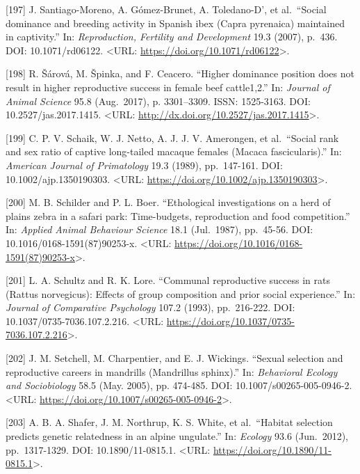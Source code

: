 \documentclass[
]{article}
\begin{document}
{[}197{]} J. Santiago-Moreno, A. Gómez-Brunet, A. Toledano-D'\iaz, et
al.~``Social dominance and breeding activity in Spanish ibex (Capra
pyrenaica) maintained in captivity.'' In: \emph{Reproduction, Fertility
and Development} 19.3 (2007), p.~436. DOI: 10.1071/rd06122.
\textless URL: \url{https://doi.org/10.1071/rd06122}\textgreater.

{[}198{]} R. Šárová, M. Špinka, and F. Ceacero. ``Higher dominance
position does not result in higher reproductive success in female beef
cattle1,2.'' In: \emph{Journal of Animal Science} 95.8 (Aug.~2017), p.
3301--3309. ISSN: 1525-3163. DOI: 10.2527/jas.2017.1415. \textless URL:
\url{http://dx.doi.org/10.2527/jas.2017.1415}\textgreater.

{[}199{]} C. P. V. Schaik, W. J. Netto, A. J. J. V. Amerongen, et
al.~``Social rank and sex ratio of captive long-tailed macaque females
(Macaca fascicularis).'' In: \emph{American Journal of Primatology} 19.3
(1989), pp.~147-161. DOI: 10.1002/ajp.1350190303. \textless URL:
\url{https://doi.org/10.1002/ajp.1350190303}\textgreater.

{[}200{]} M. B. Schilder and P. L. Boer. ``Ethological investigations on
a herd of plains zebra in a safari park: Time-budgets, reproduction and
food competition.'' In: \emph{Applied Animal Behaviour Science} 18.1
(Jul.~1987), pp.~45-56. DOI: 10.1016/0168-1591(87)90253-x.
\textless URL:
\url{https://doi.org/10.1016/0168-1591(87)90253-x}\textgreater.

{[}201{]} L. A. Schultz and R. K. Lore. ``Communal reproductive success
in rats (Rattus norvegicus): Effects of group composition and prior
social experience.'' In: \emph{Journal of Comparative Psychology} 107.2
(1993), pp.~216-222. DOI: 10.1037/0735-7036.107.2.216. \textless URL:
\url{https://doi.org/10.1037/0735-7036.107.2.216}\textgreater.

{[}202{]} J. M. Setchell, M. Charpentier, and E. J. Wickings. ``Sexual
selection and reproductive careers in mandrills (Mandrillus sphinx).''
In: \emph{Behavioral Ecology and Sociobiology} 58.5 (May. 2005), pp.
474-485. DOI: 10.1007/s00265-005-0946-2. \textless URL:
\url{https://doi.org/10.1007/s00265-005-0946-2}\textgreater.

{[}203{]} A. B. A. Shafer, J. M. Northrup, K. S. White, et al.~``Habitat
selection predicts genetic relatedness in an alpine ungulate.'' In:
\emph{Ecology} 93.6 (Jun.~2012), pp.~1317-1329. DOI: 10.1890/11-0815.1.
\textless URL: \url{https://doi.org/10.1890/11-0815.1}\textgreater.
\end{document}
